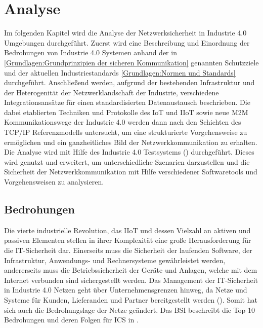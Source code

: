 \chapter{Analyse}
\label{Analyse}
Im folgenden Kapitel wird die Analyse der Netzwerksicherheit in Industrie 4.0 Umgebungen durchgeführt. Zuerst wird eine Beschreibung und Einordnung der Bedrohungen von Industrie 4.0 Systemen anhand der in \autoref{Grundlagen:Grundprinzipien der sicheren Kommunikation} genannten Schutzziele und der aktuellen Industriestandards \autoref{Grundlagen:Normen und Standards} durchgeführt. Anschließend werden, aufgrund der bestehenden Infrastruktur und der Heterogenität der Netzwerklandschaft der Industrie, verschiedene Integrationsansätze für einen standardisierten Datenaustausch beschrieben. Die dabei etablierten Techniken und Protokolle des \ac{IoT} und \ac{IIoT} sowie neue \ac{M2M} Kommunikationswege der Industrie 4.0 werden dann nach den Schichten des \ac{TCP}/\ac{IP} Referenzmodells untersucht, um eine strukturierte Vorgehensweise zu ermöglichen und ein ganzheitliches Bild der Netzwerkkommunikation zu erhalten. Die Analyse wird mit Hilfe des Industrie 4.0 Testsystems (\cite{Weber2018}) durchgeführt. Dieses wird genutzt und erweitert, um unterschiedliche Szenarien darzustellen und die Sicherheit der Netzwerkkommunikation mit Hilfe verschiedener Softwaretools und Vorgehensweisen zu analysieren.

\section{Bedrohungen}
\label{Analyse:Bedrohungen}
Die vierte industrielle Revolution, das \ac{IIoT} und dessen Vielzahl an aktiven und passiven Elementen stellen in ihrer Komplexität eine große Herausforderung für die IT-Sicherheit dar. Einerseits muss die Sicherheit der laufenden Software, der Infrastruktur, Anwendungs- und Rechnersysteme gewährleistet werden, andererseits muss die Betriebssicherheit der Geräte und Anlagen, welche mit dem Internet verbunden sind sichergestellt werden. Das Management der IT-Sicherheit in Industrie 4.0 Netzen geht über Unternehmensgrenzen hinweg, da Netze und Systeme für Kunden, Lieferanden und Partner bereitgestellt werden (\cite{DTAG2016}). Somit hat sich auch die Bedrohungslage der Netze geändert. Das \ac{BSI} beschreibt die Top 10 Bedrohungen und deren Folgen für \ac{ICS} in \cite{ICSSec2016}.

